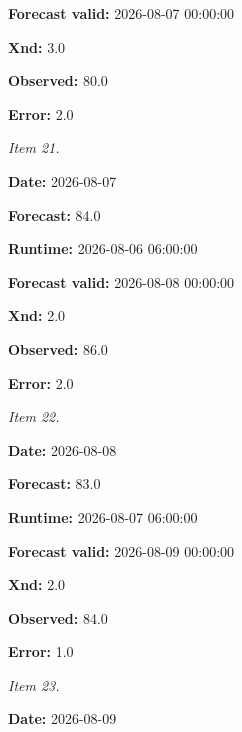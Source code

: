 \documentclass[11pt]{article}
\begin{document}
\par\noindent\textbf{Forecast valid:} 2026-08-07 00:00:00

\par\noindent\textbf{Xnd:} 3.0

\par\noindent\textbf{Observed:} 80.0

\par\noindent\textbf{Error:} 2.0

\par\noindent\textit{Item 21.}\par \par\noindent\textbf{Date:} 2026-08-07

\par\noindent\textbf{Forecast:} 84.0

\par\noindent\textbf{Runtime:} 2026-08-06 06:00:00

\par\noindent\textbf{Forecast valid:} 2026-08-08 00:00:00

\par\noindent\textbf{Xnd:} 2.0

\par\noindent\textbf{Observed:} 86.0

\par\noindent\textbf{Error:} 2.0

\par\noindent\textit{Item 22.}\par \par\noindent\textbf{Date:} 2026-08-08

\par\noindent\textbf{Forecast:} 83.0

\par\noindent\textbf{Runtime:} 2026-08-07 06:00:00

\par\noindent\textbf{Forecast valid:} 2026-08-09 00:00:00

\par\noindent\textbf{Xnd:} 2.0

\par\noindent\textbf{Observed:} 84.0

\par\noindent\textbf{Error:} 1.0

\par\noindent\textit{Item 23.}\par \par\noindent\textbf{Date:} 2026-08-09
\end{document}
